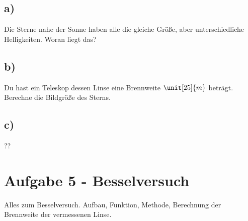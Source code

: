 \subsection*{a)}

Die Sterne nahe der Sonne haben alle die gleiche Größe, aber unterschiedliche Helligkeiten. Woran liegt das?


\subsection*{b)}

Du hast ein Teleskop dessen Linse eine Brennweite $\unit[25]{m}$ beträgt. Berechne die Bildgröße des Sterns.


\subsection*{c)}

??

\section{Aufgabe 5 - Besselversuch}

Alles zum Besselversuch. Aufbau, Funktion, Methode, Berechnung der Brennweite der vermessenen Linse.





















